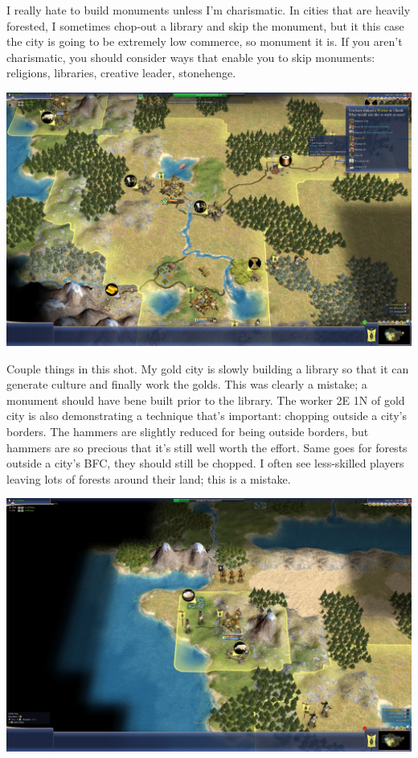 \documentclass[10pt]{article}
\begin{document}
I really hate to build monuments unless I'm charismatic. In cities that are heavily forested, I sometimes
chop-out a library and skip the monument, but it this case the city is going to be extremely low commerce,
so monument it is. If you aren't charismatic, you should consider ways that enable you to skip monuments:
religions, libraries, creative leader, stonehenge.

\includegraphics[width=1.0\textwidth]{31}

Couple things in this shot. My gold city is slowly building a library so that it can generate culture and
finally work the golds. This was clearly a mistake; a monument should have bene built prior to the library.
The worker 2E 1N of gold city is also demonstrating a technique that's important: chopping outside a city's
borders. The hammers are slightly reduced for being outside borders, but hammers are so precious that it's
still well worth the effort. Same goes for forests outside a city's BFC, they should still be chopped. I
often see less-skilled players leaving lots of forests around their land; this is a mistake.

\includegraphics[width=1.0\textwidth]{34}
\end{document}
